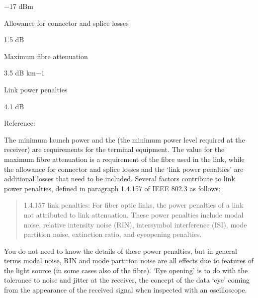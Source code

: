 \documentclass[letterpaper,10pt,english]{sphinxmanual}
\begin{document}
−17 dBm









Allowance for connector and splice losses





1.5 dB









Maximum fibre attenuation





3.5 dB km−1









Link power penalties





4.1 dB







Reference:



The minimum launch power and the  (the minimum power level required at the receiver) are requirements for the terminal equipment. The value for the maximum fibre attenuation is a requirement of the fibre used in the link, while the allowance for connector and splice losses and the ‘link power penalties’ are additional losses that need to be included. Several factors contribute to link power penalties, defined in paragraph 1.4.157 of IEEE 802.3 as follows:


\begin{quote}

1.4.157 link penalties: For fiber optic links, the power penalties of a link not attributed to link attenuation. These power penalties include modal noise, relative intensity noise (RIN), intersymbol interference (ISI), mode partition noise, extinction ratio, and eye\sphinxhyphen{}opening penalties.
\end{quote}

You do not need to know the details of these power penalties, but in general terms modal noise, RIN and mode partition noise are all effects due to features of the light source (in some cases also of the fibre). ‘Eye opening’ is to do with the tolerance to noise and jitter at the receiver, the concept of the data ‘eye’ coming from the appearance of the received signal when inspected with an oscilloscope.
\end{document}

